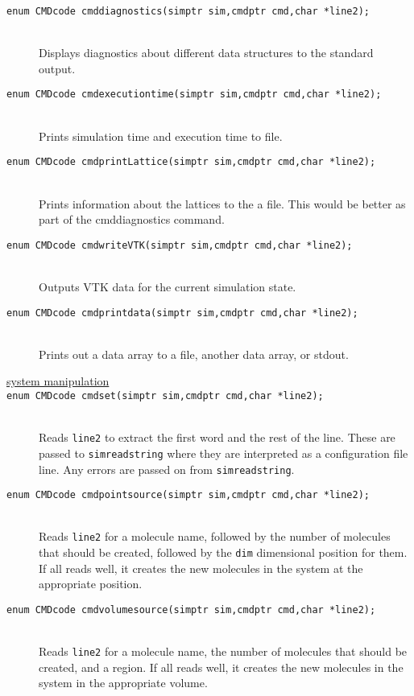 \documentclass {scrbook}
\newcommand {\ttt} {\texttt}
\begin{document}
\begin{description}
\item[\ttt{enum CMDcode cmddiagnostics(simptr sim,cmdptr cmd,char *line2);}]
\hfill \\
Displays diagnostics about different data structures to the standard output.

\item[\ttt{enum CMDcode cmdexecutiontime(simptr sim,cmdptr cmd,char *line2);}]
\hfill \\
Prints simulation time and execution time to file.

\item[\ttt{enum CMDcode cmdprintLattice(simptr sim,cmdptr cmd,char *line2);}]
\hfill \\
Prints information about the lattices to the a file. This would be better as part of the cmddiagnostics command.

\item[\ttt{enum CMDcode cmdwriteVTK(simptr sim,cmdptr cmd,char *line2);}]
\hfill \\
Outputs VTK data for the current simulation state.

\item[\ttt{enum CMDcode cmdprintdata(simptr sim,cmdptr cmd,char *line2);}]
\hfill \\
Prints out a data array to a file, another data array, or stdout.

\item[\underline{system manipulation}]

\item[\ttt{enum CMDcode cmdset(simptr sim,cmdptr cmd,char *line2);}]
\hfill \\
Reads \ttt{line2} to extract the first word and the rest of the line. These are passed to \ttt{simreadstring} where they are interpreted as a configuration file line. Any errors are passed on from \ttt{simreadstring}.

\item[\ttt{enum CMDcode cmdpointsource(simptr sim,cmdptr cmd,char *line2);}]
\hfill \\
Reads \ttt{line2} for a molecule name, followed by the number of molecules that should be created, followed by the \ttt{dim} dimensional position for them. If all reads well, it creates the new molecules in the system at the appropriate position.

\item[\ttt{enum CMDcode cmdvolumesource(simptr sim,cmdptr cmd,char *line2);}]
\hfill \\
Reads \ttt{line2} for a molecule name, the number of molecules that should be created, and a region. If all reads well, it creates the new molecules in the system in the appropriate volume.


\end{description}
\end{document}
